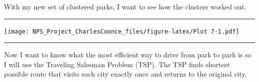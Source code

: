 \documentclass[
]{article}
\newenvironment{Shaded}{\begin{snugshade}}{\end{snugshade}}
\newcommand{\AttributeTok}[1]{\textcolor[rgb]{0.13,0.29,0.53}{#1}}
\newcommand{\DecValTok}[1]{\textcolor[rgb]{0.00,0.00,0.81}{#1}}
\newcommand{\DocumentationTok}[1]{\textcolor[rgb]{0.56,0.35,0.01}{\textbf{\textit{#1}}}}
\newcommand{\FunctionTok}[1]{\textcolor[rgb]{0.13,0.29,0.53}{\textbf{#1}}}
\newcommand{\NormalTok}[1]{#1}
\newcommand{\OtherTok}[1]{\textcolor[rgb]{0.56,0.35,0.01}{#1}}
\newcommand{\SpecialCharTok}[1]{\textcolor[rgb]{0.81,0.36,0.00}{\textbf{#1}}}
\newcommand{\StringTok}[1]{\textcolor[rgb]{0.31,0.60,0.02}{#1}}
\begin{document}
\begin{Shaded}
\end{Shaded}

\newpage

With my new set of clustered parks, I want to see how the clusters
worked out.

\begin{center}\rule{0.5\linewidth}{0.5pt}\end{center}

\texttt{[image: NPS\_Project\_CharlesCoonce\_files/figure-latex/Plot 7-1.pdf]}

\begin{center}\rule{0.5\linewidth}{0.5pt}\end{center}

\label{cluster_parks_tsp}
Now I want to know what the most efficient way to drive from park to
park is so I will use the Traveling Salesman Problem (TSP). The TSP
finds shortest possible route that visits each city exactly once and
returns to the original city.
\end{document}
